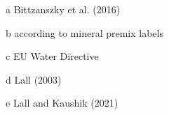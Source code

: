 \begin{table}
\begin{threeparttable}
\begin{tabularx}{\textwidth}{XXXXXX}
\bottomrule

    \end{tabularx}
    \begin{tablenotes}
      \item[a] Bittzanszky et al. (2016)
      \item[b] according to mineral premix labels
      \item[c] EU Water Directive
      \item[d] Lall (2003)
      \item[e] Lall and Kaushik (2021)
    \end{tablenotes}
  \end{threeparttable}
\end{table}
